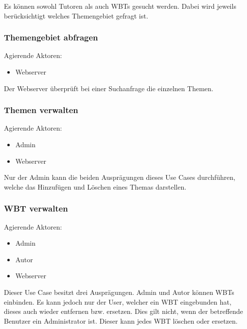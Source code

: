Es können sowohl Tutoren als auch WBTs gesucht werden. Dabei wird jeweils
berücksichtigt welches Themengebiet gefragt ist.
	
\subsubsection{Themengebiet abfragen}
Agierende Aktoren: \begin{itemize}
  \item Webserver
\end{itemize}

Der Webserver überprüft bei einer Suchanfrage die einzelnen Themen.
	
\subsubsection{Themen verwalten}
Agierende Aktoren: \begin{itemize}
  \item Admin
  \item Webserver
\end{itemize}

Nur der Admin kann die beiden Ausprägungen dieses Use Cases durchführen, welche
das Hinzufügen und Löschen eines Themas darstellen.
	
\subsubsection{WBT verwalten}
Agierende Aktoren: \begin{itemize}
  \item Admin
  \item Autor
  \item Webserver
\end{itemize}

Dieser Use Case besitzt drei Ausprägungen. Admin und Autor können WBTs
einbinden. Es kann jedoch nur der User, welcher ein WBT eingebunden hat, dieses
auch wieder entfernen bzw. ersetzen. Dies gilt nicht, wenn der betreffende
Benutzer ein Administrator ist. Dieser kann jedes WBT löschen oder ersetzen.
	

